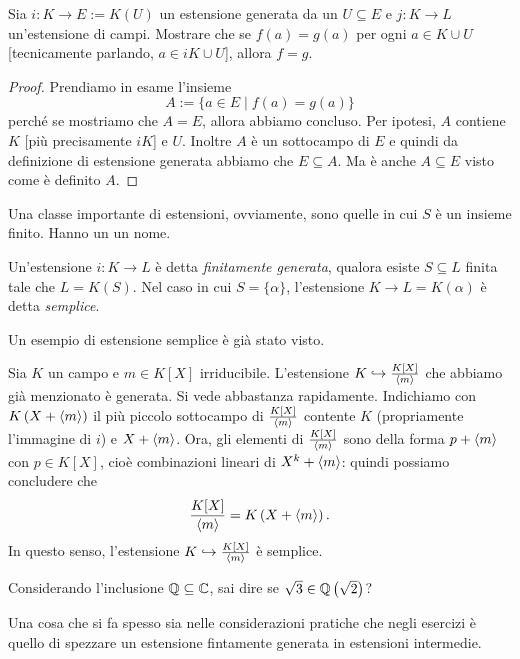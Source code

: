 \begin{prop}
Sia \(i : K \to E := K(U)\) un estensione generata da un \(U \subseteq E\) e \(j : K \to L\) un'estensione di campi. Mostrare che se \(f(a) = g(a)\) per ogni \(a \in K \cup U\) [tecnicamente parlando, \(a \in i K \cup U\)], allora \(f = g\).
\end{prop}

\begin{proof}
Prendiamo in esame l'insieme
\[A := \{a \in E \mid f(a) = g(a)\}\]
perché se mostriamo che \(A = E\), allora abbiamo concluso. Per ipotesi, \(A\) contiene \(K\) [più precisamente \(i K\)] e \(U\). Inoltre \(A\) è un sottocampo di \(E\) e quindi da definizione di estensione generata abbiamo che \(E \subseteq A\). Ma è anche \(A \subseteq E\) visto come è definito \(A\).
\end{proof}

Una classe importante di estensioni, ovviamente, sono quelle in cui \(S\) è un insieme finito. Hanno un un nome.

\begin{defi}
Un'estensione \(i : K \to L\) è detta {\em finitamente generata}, qualora esiste \(S \subseteq L\) finita tale che \(L = K(S)\). Nel caso in cui \(S = \{\alpha\}\), l'estensione \(K \to L = K(\alpha)\) è detta {\em semplice}.
\end{defi}

Un esempio di estensione semplice è già stato visto.

\begin{esem}
Sia \(K\) un campo e \(m \in K[X]\) irriducibile. L'estensione \(K \hookrightarrow \frac{K[X]}{\left\langle m\right\rangle}\) che abbiamo già menzionato è generata. Si vede abbastanza rapidamente. Indichiamo con \(K\left(X + \left\langle m\right\rangle\right)\) il più piccolo sottocampo di \(\frac{K[X]}{\left\langle m\right\rangle}\) contente \(K\) (propriamente l'immagine di \(i\)) e \(X + \left\langle m\right\rangle\). Ora, gli elementi di \(\frac{K[X]}{\left\langle m\right\rangle}\) sono della forma \(p + \left\langle m\right\rangle\) con \(p \in K[X]\), cioè combinazioni lineari di \(X^k +\left\langle m\right\rangle\): quindi possiamo concludere che
\[\frac{K[X]}{\left\langle m\right\rangle} = K\left(X + \left\langle m\right\rangle\right) .\]
In questo senso, l'estensione \(K \hookrightarrow \frac{K[X]}{\left\langle m\right\rangle}\) è semplice.
\end{esem}

\begin{eser}
Considerando l'inclusione \(\mathbb{Q} \subseteq \mathbb{C}\), sai dire se \(\sqrt3 \in \mathbb{Q}\left(\sqrt2\right)\)?
\end{eser}

Una cosa che si fa spesso sia nelle considerazioni pratiche che negli esercizi è quello di spezzare un estensione fintamente generata in estensioni intermedie.

